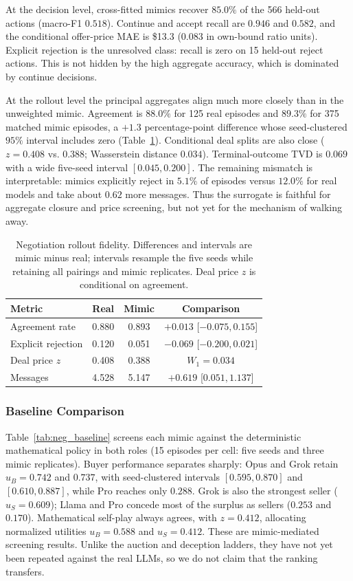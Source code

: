 \documentclass[conference]{IEEEtran}
\begin{document}
At the decision level, cross-fitted mimics recover $85.0\%$ of the 566 held-out actions (macro-F1 $0.518$). Continue and accept recall are $0.946$ and $0.582$, and the conditional offer-price MAE is \$13.3 (0.083 in own-bound ratio units). Explicit rejection is the unresolved class: recall is zero on 15 held-out reject actions. This is not hidden by the high aggregate accuracy, which is dominated by continue decisions.

At the rollout level the principal aggregates align much more closely than in the unweighted mimic. Agreement is $88.0\%$ for 125 real episodes and $89.3\%$ for 375 matched mimic episodes, a $+1.3$ percentage-point difference whose seed-clustered $95\%$ interval includes zero (Table~\ref{tab:neg_fidelity}). Conditional deal splits are also close ($z=0.408$ vs. $0.388$; Wasserstein distance $0.034$). Terminal-outcome TVD is $0.069$ with a wide five-seed interval $[0.045,0.200]$. The remaining mismatch is interpretable: mimics explicitly reject in $5.1\%$ of episodes versus $12.0\%$ for real models and take about $0.62$ more messages. Thus the surrogate is faithful for aggregate closure and price screening, but not yet for the mechanism of walking away.

\begin{table}[htbp]
\caption{Negotiation rollout fidelity. Differences and intervals are mimic minus real; intervals resample the five seeds while retaining all pairings and mimic replicates. Deal price $z$ is conditional on agreement.}
\label{tab:neg_fidelity}
\centering
\begin{tabular}{lccc}
\hline
Metric & Real & Mimic & Comparison \\
\hline
Agreement rate & 0.880 & 0.893 & $+0.013$ [$-0.075,0.155$] \\
Explicit rejection & 0.120 & 0.051 & $-0.069$ [$-0.200,0.021$] \\
Deal price $z$ & 0.408 & 0.388 & $W_1=0.034$ \\
Messages & 4.528 & 5.147 & $+0.619$ [$0.051,1.137$] \\
\hline
\end{tabular}
\end{table}

\subsubsection{Baseline Comparison}

Table~\ref{tab:neg_baseline} screens each mimic against the deterministic mathematical policy in both roles (15 episodes per cell: five seeds and three mimic replicates). Buyer performance separates sharply: Opus and Grok retain $u_B=0.742$ and $0.737$, with seed-clustered intervals $[0.595,0.870]$ and $[0.610,0.887]$, while Pro reaches only $0.288$. Grok is also the strongest seller ($u_S=0.609$); Llama and Pro concede most of the surplus as sellers ($0.253$ and $0.170$). Mathematical self-play always agrees, with $z=0.412$, allocating normalized utilities $u_B=0.588$ and $u_S=0.412$. These are mimic-mediated screening results. Unlike the auction and deception ladders, they have not yet been repeated against the real LLMs, so we do not claim that the ranking transfers.
\end{document}
